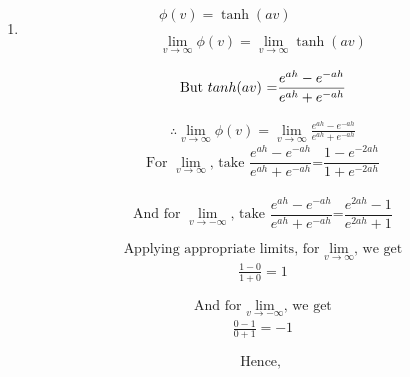 \documentclass[12pt]{article}
\begin{document}
\begin{enumerate}
  \item \begin{gather}
            \phi(v) = \tanh(av) \nonumber \\ \nonumber\\ 
            \lim_{v\to\infty} \phi(v) = \lim_{v\to\infty}\tanh(av) \label{eqn:2}
        \end{gather}
        
        \[
            \text{But\ $tanh(av)$ =$\frac{e^{ah}-e^{-ah}}{e^{ah}+e^{-ah}}$} \\  
        \]
        
        \begin{gather}             
            \therefore \lim_{v\to\infty} \phi(v) = \lim_{v\to\infty}\frac{e^{ah}-e^{-ah}}{e^{ah}+e^{-ah}} \label{eqn:2}    
        \end{gather}
        \[
            \text{For $\lim_{v\to\infty}$, take $\frac{e^{ah}-e^{-ah}}{e^{ah}+e^{-ah}}$=$\frac{1-e^{-2ah}}{1+e^{-2ah}}$}
        \]\\
        \[
            \text{And for $\lim_{v\to-\infty}$, take $\frac{e^{ah}-e^{-ah}}{e^{ah}+e^{-ah}}$=$\frac{e^{2ah}-1}{e^{2ah}+1}$}
        \]
        
        \[
            \text{Applying appropriate limits, for $\lim_{v\to\infty}$, we get} 
        \]
        \begin{gather}
            \frac{1-0}{1+0} = 1
        \end{gather}
        
        \[
            \text{And for $\lim_{v\to-\infty}$, we get} 
        \]
        \begin{gather}
            \frac{0-1}{0+1} = -1
        \end{gather}
       
       \[
            \text{Hence, } 
        \]
\end{enumerate}
\end{document}
